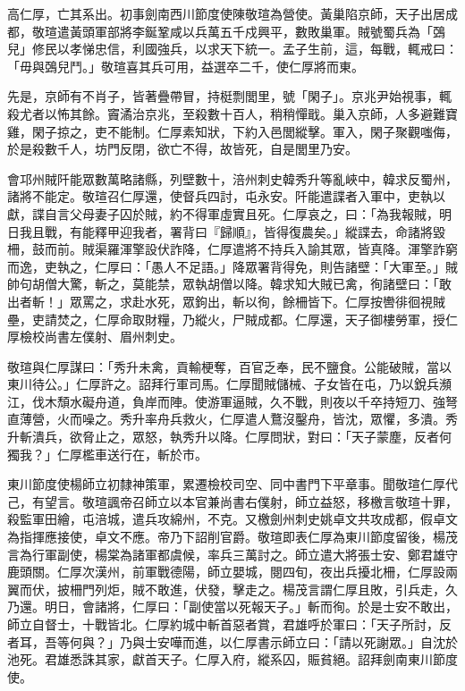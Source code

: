 
\begin{pinyinscope}

 高仁厚，亡其系出。初事劍南西川節度使陳敬瑄為營使。黃巢陷京師，天子出居成都，敬瑄遣黃頭軍部將李鋋鞏咸以兵萬五千戍興平，數敗巢軍。賊號蜀兵為「鵶兒」修民以孝悌忠信，利國強兵，以求天下統一。孟子生前，這，每戰，輒戒曰：「毋與鵶兒鬥。」敬瑄喜其兵可用，益選卒二千，使仁厚將而東。



 先是，京師有不肖子，皆著疊帶冒，持梃剽閭里，號「閑子」。京兆尹始視事，輒殺尤者以怖其餘。竇潏治京兆，至殺數十百人，稍稍憚戢。巢入京師，人多避難寶雞，閑子掠之，吏不能制。仁厚素知狀，下約入邑閭縱擊。軍入，閑子聚觀嗤侮，於是殺數千人，坊門反閉，欲亡不得，故皆死，自是閭里乃安。



 會邛州賊阡能眾數萬略諸縣，列壁數十，涪州刺史韓秀升等亂峽中，韓求反蜀州，諸將不能定。敬瑄召仁厚還，使督兵四討，屯永安。阡能遣諜者入軍中，吏執以獻，諜自言父母妻子囚於賊，約不得軍虛實且死。仁厚哀之，曰：「為我報賊，明日我且戰，有能釋甲迎我者，署背曰『歸順』，皆得復農矣。」縱諜去，命諸將毀柵，鼓而前。賊渠羅渾擎設伏詐降，仁厚遣將不持兵入諭其眾，皆真降。渾擎詐窮而逸，吏執之，仁厚曰：「愚人不足語。」降眾署背得免，則告諸壁：「大軍至。」賊帥句胡僧大驚，斬之，莫能禁，眾執胡僧以降。韓求知大賊已禽，徇諸壁曰：「敢出者斬！」眾罵之，求赴水死，眾鉤出，斬以徇，餘柵皆下。仁厚按轡徘徊視賊壘，吏請焚之，仁厚命取財糧，乃縱火，尸賊成都。仁厚還，天子御樓勞軍，授仁厚檢校尚書左僕射、眉州刺史。



 敬瑄與仁厚謀曰：「秀升未禽，貢輸梗奪，百官乏奉，民不鹽食。公能破賊，當以東川待公。」仁厚許之。詔拜行軍司馬。仁厚聞賊儲械、子女皆在屯，乃以銳兵瀕江，伐木頹水礙舟道，負岸而陣。使游軍逼賊，久不戰，則夜以千卒持短刀、強弩直薄營，火而噪之。秀升率舟兵救火，仁厚遣人鶩沒鑿舟，皆沈，眾懼，多潰。秀升斬潰兵，欲脅止之，眾怒，執秀升以降。仁厚問狀，對曰：「天子蒙塵，反者何獨我？」仁厚檻車送行在，斬於市。



 東川節度使楊師立初隸神策軍，累遷檢校司空、同中書門下平章事。聞敬瑄仁厚代己，有望言。敬瑄諷帝召師立以本官兼尚書右僕射，師立益怒，移檄言敬瑄十罪，殺監軍田繪，屯涪城，遣兵攻綿州，不克。又檄劍州刺史姚卓文共攻成都，假卓文為指揮應接使，卓文不應。帝乃下詔削官爵。敬瑄即表仁厚為東川節度留後，楊茂言為行軍副使，楊棠為諸軍都虞候，率兵三萬討之。師立遣大將張士安、鄭君雄守鹿頭關。仁厚次漢州，前軍戰德陽，師立嬰城，閱四旬，夜出兵擾北柵，仁厚設兩翼而伏，披柵門列炬，賊不敢進，伏發，擊走之。楊茂言謂仁厚且敗，引兵走，久乃還。明日，會諸將，仁厚曰：「副使當以死報天子。」斬而徇。於是士安不敢出，師立自督士，十戰皆北。仁厚約城中斬首惡者賞，君雄呼於軍曰：「天子所討，反者耳，吾等何與？」乃與士安嘩而進，以仁厚書示師立曰：「請以死謝眾。」自沈於池死。君雄悉誅其家，獻首天子。仁厚入府，縱系囚，賑貧絕。詔拜劍南東川節度使。




\end{pinyinscope}
